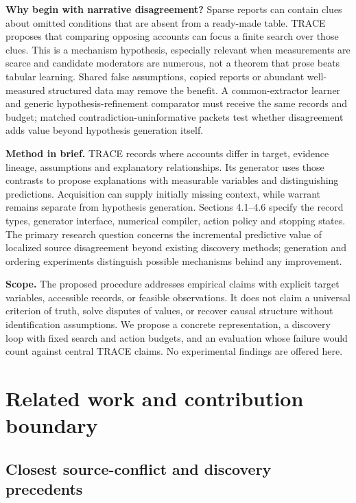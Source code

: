 \documentclass[11pt,a4paper]{article}
\begin{document}
\textbf{Why begin with narrative disagreement?} Sparse reports can
contain clues about omitted conditions that are absent from a ready-made
table. TRACE proposes that comparing opposing accounts can focus a
finite search over those clues. This is a mechanism hypothesis,
especially relevant when measurements are scarce and candidate
moderators are numerous, not a theorem that prose beats tabular
learning. Shared false assumptions, copied reports or abundant
well-measured structured data may remove the benefit. A common-extractor
learner and generic hypothesis-refinement comparator must receive the
same records and budget; matched contradiction-uninformative packets
test whether disagreement adds value beyond hypothesis generation
itself.

\textbf{Method in brief.} TRACE records where accounts differ in target,
evidence lineage, assumptions and explanatory relationships. Its
generator uses those contrasts to propose explanations with measurable
variables and distinguishing predictions. Acquisition can supply
initially missing context, while warrant remains separate from
hypothesis generation. Sections 4.1--4.6 specify the record types,
generator interface, numerical compiler, action policy and stopping
states. The primary research question concerns the incremental
predictive value of localized source disagreement beyond existing
discovery methods; generation and ordering experiments distinguish
possible mechanisms behind any improvement.

\textbf{Scope.} The proposed procedure addresses empirical claims with
explicit target variables, accessible records, or feasible observations.
It does not claim a universal criterion of truth, solve disputes of
values, or recover causal structure without identification assumptions.
We propose a concrete representation, a discovery loop with fixed search
and action budgets, and an evaluation whose failure would count against
central TRACE claims. No experimental findings are offered here.

\section{Related work and contribution
boundary}\label{related-work-and-contribution-boundary}

\subsection{Closest source-conflict and discovery
precedents}\label{closest-source-conflict-and-discovery-precedents}
\end{document}
